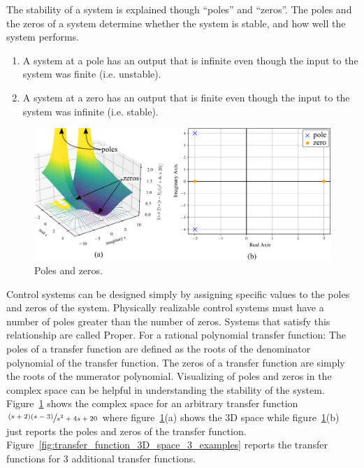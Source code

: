 \documentclass[12pt,letter]{article}
\begin{document}
	The stability of a system is explained though ``poles'' and ``zeros''. The poles and the zeros of a system determine whether the system is stable, and how well the system performs.

	\begin{enumerate}
		\item A system at a pole has an output that is infinite even though the input to the system was finite (i.e. unstable). 
		\item A system at a zero has an output that is finite even though the input to the system was infinite (i.e. stable).
	\end{enumerate}
 








			\begin{figure}[H]
				\centering
				\includegraphics[width=5.0in]{../figures/transfer_function_poles_and_zeros_and_3D_space.png}
				\caption{Poles and zeros.}
				\label{fig:transfer_function_poles_and_zeros_and_3D_space}
			\end{figure}

	Control systems can be designed simply by assigning specific values to the poles and zeros of the system. Physically realizable control systems must have a number of poles greater than the number of zeros. Systems that satisfy this relationship are called Proper. For a rational polynomial transfer function: The poles of a transfer function are defined as the roots of the denominator polynomial of the transfer function.  The zeros of a transfer function are simply the roots of the numerator polynomial. Visualizing of poles and zeros in the complex space can be helpful in understanding the stability of the system. Figure~\ref{fig:transfer_function_poles_and_zeros_and_3D_space} shows the complex space for an arbitrary transfer function $\sfrac{(s+2)(s-3)}{s^2+4s+20}$ where figure~\ref{fig:transfer_function_poles_and_zeros_and_3D_space}(a) shows the 3D space while figure~\ref{fig:transfer_function_poles_and_zeros_and_3D_space}(b) just reports the poles and zeros of the transfer function.  Figure~\ref{fig:transfer_function_3D_space_3_examples} reports the transfer functions for 3 additional transfer functions.  
\end{document}
